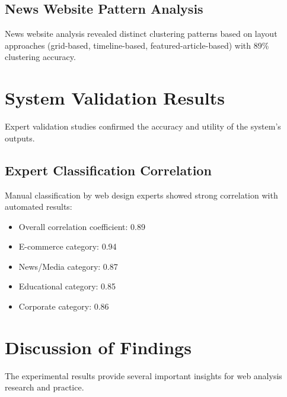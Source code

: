 
\subsection{News Website Pattern Analysis}
\label{subsec:news-results}

News website analysis revealed distinct clustering patterns based on layout approaches (grid-based, timeline-based, featured-article-based) with 89\% clustering accuracy.

\section{System Validation Results}
\label{sec:validation-results}

Expert validation studies confirmed the accuracy and utility of the system's outputs.

\subsection{Expert Classification Correlation}
\label{subsec:expert-correlation}

Manual classification by web design experts showed strong correlation with automated results:
\begin{itemize}
    \item Overall correlation coefficient: 0.89
    \item E-commerce category: 0.94
    \item News/Media category: 0.87
    \item Educational category: 0.85
    \item Corporate category: 0.86
\end{itemize}

\section{Discussion of Findings}
\label{sec:findings-discussion}

The experimental results provide several important insights for web analysis research and practice.

